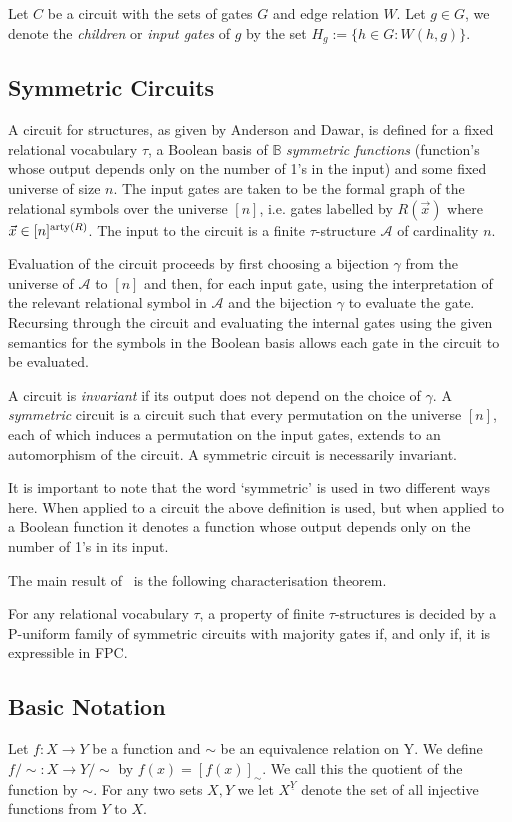 \documentclass[../paper.tex]{subfiles}
\begin{document}
Let $C$ be a circuit with the sets of gates $G$ and edge relation $W$. Let $g
\in G$, we denote the \emph{children} or \emph{input gates} of $g$ by the set
$H_g := \{h \in G : W(h,g)\}$.

\subsection{Symmetric Circuits}
A circuit for structures, as given by Anderson and Dawar, is defined for a fixed
relational vocabulary $\tau$, a Boolean basis of $\mathbb{B}$ \emph{symmetric
  functions} (function's whose output depends only on the number of 1's in the
input) and some fixed universe of size $n$. The input gates are taken to be the
formal graph of the relational symbols over the universe $[n]$, i.e. gates
labelled by $R(\vec{x})$ where $\vec{x} \in [n]^{\mathrm{arty}(R)}$. The input to the
circuit is a finite $\tau$-structure $\mathcal{A}$ of cardinality $n$.

Evaluation of the circuit proceeds by first choosing a bijection $\gamma$ from
the universe of $\mathcal{A}$ to $[n]$ and then, for each input gate, using the
interpretation of the relevant relational symbol in $\mathcal{A}$ and the
bijection $\gamma$ to evaluate the gate. Recursing through the circuit and
evaluating the internal gates using the given semantics for the symbols in the
Boolean basis allows each gate in the circuit to be evaluated.

A circuit is \emph{invariant} if its output does not depend on the choice of
$\gamma$. A \emph{symmetric} circuit is a circuit such that every permutation on
the universe $[n]$, each of which induces a permutation on the input gates,
extends to an automorphism of the circuit. A symmetric circuit is necessarily
invariant.

It is important to note that the word `symmetric' is used in two different ways
here. When applied to a circuit the above definition is used, but when applied
to a Boolean function it denotes a function whose output depends only on the
number of 1's in its input.

The main result of~\cite{AndersonD17} is the following characterisation theorem.

\begin{thm}
  For any relational vocabulary $\tau$, a property of finite $\tau$-structures
  is decided by a P-uniform family of symmetric circuits with majority gates if,
  and only if, it is expressible in FPC.
\end{thm}

\subsection{Basic Notation}

Let $f : X \rightarrow Y$ be a function and $\sim$ be an equivalence relation on
Y. We define $f/{\sim} : X \rightarrow Y/{\sim}$ by $f(x) = [f(x)]_{\sim}$. We
call this the quotient of the function by $\sim$. For any two sets $X, Y$ we let
$X^{\underline{Y}}$ denote the set of all injective functions from $Y$ to $X$.
\end{document}
